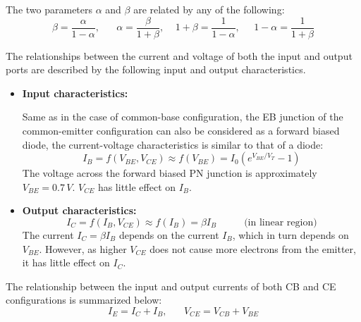 \documentclass{article}
\begin{document}
\begin{itemize}
  The two parameters $\alpha$ and $\beta$ are related by any of the 
  following:
  \begin{equation}
  \beta=\frac{\alpha}{1-\alpha},\;\;\;\;\;\;\alpha=\frac{\beta}{1+\beta},
  \;\;\;\;1+\beta=\frac{1}{1-\alpha},\;\;\;\;\;1-\alpha=\frac{1}{1+\beta} 
  \end{equation}


  The relationships between the current and voltage of both the input 
  and output ports are described by the following input and output 
  characteristics.

  \begin{itemize}
  \item {\bf Input characteristics:} 

    Same as in the case of common-base configuration, the EB junction of the
    common-emitter configuration can also be considered as a forward biased
    diode, the current-voltage characteristics is similar to that of a diode:
    \begin{equation}
      I_B=f(V_{BE},V_{CE})\approx f(V_{BE})=I_0 ( e^{V_{BE}/V_T}-1 )	
    \end{equation}
    The voltage across the forward biased PN junction is approximately 
    $V_{BE}=0.7\,V$. $V_{CE}$ has little effect on $I_B$.
    
  \item {\bf Output characteristics:} 
    \begin{equation}
      I_C=f(I_B,V_{CE})\approx f(I_B)=\beta I_B\;\;\;\;\;\;\;\;\;\;\mbox{(in linear region)} 
    \end{equation}
    The current $I_C=\beta I_B$ depends on the current $I_B$, which in 
    turn depends on $V_{BE}$. However, as higher $V_{CE}$ does not cause
    more electrons from the emitter, it has little effect on $I_C$.

    
  \end{itemize}
\end{itemize}

The relationship between the input and output currents of both CB and CE 
configurations is summarized below:
\begin{equation}
  I_E=I_C+I_B,\;\;\;\;\;\;V_{CE}=V_{CB}+V_{BE}
\end{equation}
\end{document}

